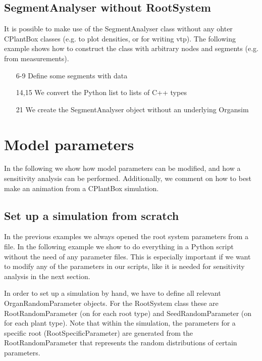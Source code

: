 \documentclass[a4paper]{article}
\begin{document}
\subsection{SegmentAnalyser without RootSystem}

It is possible to make use of the SegmentAnalyser class without any ohter CPlantBox classes (e.g. to plot densities, or for writing vtp). The following example shows how to construct the class with arbitrary nodes and segments (e.g. from measurements). 



\begin{itemize}
 \item[6-9] Define some segments with data
 \item[14,15] We convert the Python list to lists of C++ types
 \item[21] We create the SegmentAnalyser object without an underlying Organsim
\end{itemize}



\section{Model parameters} %

In the following we show how model parameters can be modified, and how a sensitivity analysis can be performed. Additionally, we comment on how to best make an animation from a CPlantBox simulation.

\subsection{Set up a simulation from scratch} \label{sec:from_scratch}

In the previous examples we always opened the root system parameters from a file. 
In the following example we show to do everything in a Python script without the need of any parameter files. 
This is especially important if we want to modify any of the parameters in our scripts, like it is needed for sensitivity analysis in the next section.

In order to set up a simulation by hand, we have to define all relevant OrganRandomParameter objects. For the RootSystem class these are RootRandomParameter (on for each root type) and SeedRandomParameter (on for each plant type). Note that within the simulation, the parameters for a specific root (RootSpecificParameter) are generated from the RootRandomParameter that represents the random distributions of certain parameters.
\end{document}
